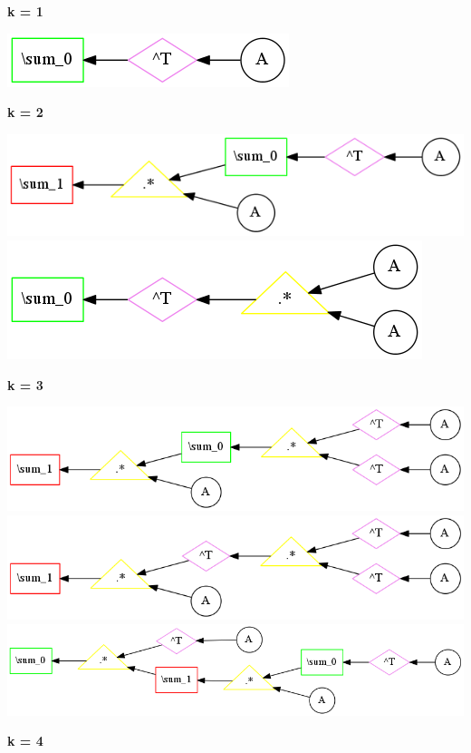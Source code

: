 {\bf k = 1}


\begin{center}
\includegraphics[width=0.45\linewidth]{trees/Sym_1_horizontal_0.png}
\end{center}


{\bf k = 2}


\begin{center}
\includegraphics[width=0.45\linewidth]{trees/Sym_2_horizontal_0.png}
\includegraphics[width=0.45\linewidth]{trees/Sym_2_horizontal_1.png}
\end{center}


{\bf k = 3}


\begin{center}
\includegraphics[width=0.45\linewidth]{trees/Sym_3_horizontal_0.png}
\includegraphics[width=0.45\linewidth]{trees/Sym_3_horizontal_1.png}
\includegraphics[width=0.45\linewidth]{trees/Sym_3_horizontal_2.png}
\end{center}


{\bf k = 4}


